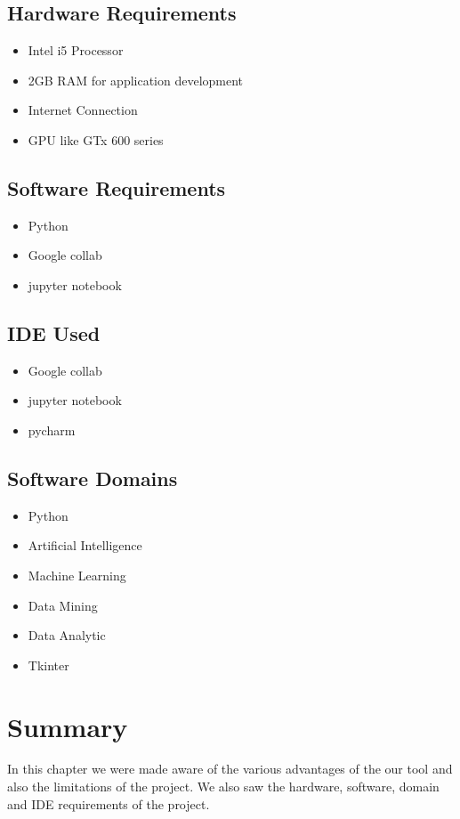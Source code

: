 \documentclass[openany,12pt]{report}
\begin{document}
{{{{{\subsection{Hardware Requirements}
\begin{itemize}
\item{Intel i5 Processor}
\item{2GB RAM for application development}
\item{Internet Connection}
\item{GPU like GTx 600 series}
\end{itemize}
\subsection{Software Requirements}
\begin{itemize}
\item{Python}
\item{Google collab}
\item{jupyter notebook}
\end{itemize}

\subsection{IDE Used}
\begin{itemize}
\item{Google collab}
\item{jupyter notebook}
\item{pycharm}
\end{itemize}

\subsection{Software Domains}
\begin{itemize}
\item{Python}
\item{Artificial Intelligence}
\item{Machine Learning}
\item{Data Mining}
\item{Data Analytic}
\item{Tkinter}
\end{itemize}

\section{Summary}
In this chapter we were made aware of the various advantages of the our tool and also the limitations of the project. We also saw the hardware, software, domain and IDE requirements of the project.
\cite{paper2}

}}}}}
\end{document}
